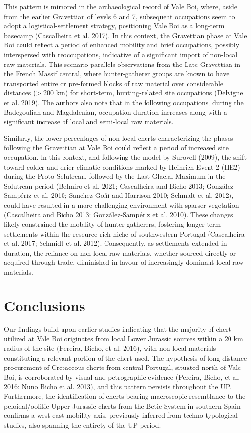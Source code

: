 \documentclass[
  a4paper,
  DIV=11,
  numbers=noendperiod]{scrreprt}
\begin{document}
This pattern is mirrored in the archaeological record of Vale Boi,
where, aside from the earlier Gravettian of levels 6 and 7, subsequent
occupations seem to adopt a logistical-settlement strategy, positioning
Vale Boi as a long-term basecamp (Cascalheira et al. 2017). In this
context, the Gravettian phase at Vale Boi could reflect a period of
enhanced mobility and brief occupations, possibly interspersed with
reoccupations, indicative of a significant import of non-local raw
materials. This scenario parallels observations from the Late Gravettian
in the French Massif central, where hunter-gatherer groups are known to
have transported entire or pre-formed blocks of raw material over
considerable distances (\textgreater{} 200 km) for short-term,
hunting-related site occupations (Delvigne et al. 2019). The authors
also note that in the following occupations, during the Badegoulian and
Magdalenian, occupation duration increases along with a significant
increase of local and semi-local raw materials.

Similarly, the lower percentages of non-local cherts characterizing the
phases following the Gravettian at Vale Boi could reflect a period of
increased site occupation. In this context, and following the model by
Surovell (2009), the shift toward colder and drier climatic conditions
marked by Heinrich Event 2 (HE2) during the Proto-Solutrean, followed by
the Last Glacial Maximum in the Solutrean period (Belmiro et al. 2021;
Cascalheira and Bicho 2013; González-Sampériz et al. 2010; Sanchez Goñi
and Harrison 2010; Schmidt et al. 2012), could have resulted in a more
challenging environment with sparser vegetation (Cascalheira and Bicho
2013; González-Sampériz et al. 2010). These changes likely constrained
the mobility of hunter-gatherers, fostering longer-term settlements
within the resource-rich niche of southwestern Portugal (Cascalheira et
al. 2017; Schmidt et al. 2012). Consequently, as settlements extended in
duration, the reliance on non-local raw materials, whether sourced
directly or acquired through trade, diminished in favour of increasingly
dominant local raw materials.

\section{Conclusions}\label{conclusions}

Our findings build upon earlier studies indicating that the majority of
chert utilized at Vale Boi originates from local Lower Jurassic sources
within a 20 km radius of the site (Pereira, Bicho, et al. 2016), with
non-local materials constituting a relevant portion of the chert used.
The hypothesis of long-distance procurement of Cretaceous cherts from
central Portugal, situated north of Vale Boi, is corroborated by visual
and petrographic evidence (Pereira, Bicho, et al. 2016; Nuno Bicho et
al. 2013), and this pattern persists throughout the UP. Furthermore, the
identification of cherts bearing macroscopic resemblance to the
peloidal/oolitic Upper Jurassic cherts from the Betic System in southern
Spain confirms a west-east mobility axis, previously inferred from
techno-typological studies, also spanning the entirety of the UP period.
\end{document}
